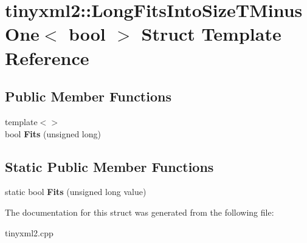 \hypertarget{structtinyxml2_1_1_long_fits_into_size_t_minus_one}{}\section{tinyxml2\+:\+:Long\+Fits\+Into\+Size\+T\+Minus\+One$<$ bool $>$ Struct Template Reference}
\label{structtinyxml2_1_1_long_fits_into_size_t_minus_one}
\subsection*{Public Member Functions}
\begin{DoxyCompactItemize}
\item 
{\footnotesize template$<$$>$ }\\bool {\bfseries Fits} (unsigned long)\hypertarget{structtinyxml2_1_1_long_fits_into_size_t_minus_one_a85fb9734fefa25d130ea831f683fc444}{}\label{structtinyxml2_1_1_long_fits_into_size_t_minus_one_a85fb9734fefa25d130ea831f683fc444}

\end{DoxyCompactItemize}
\subsection*{Static Public Member Functions}
\begin{DoxyCompactItemize}
\item 
static bool {\bfseries Fits} (unsigned long value)\hypertarget{structtinyxml2_1_1_long_fits_into_size_t_minus_one_a3057710104ab733963eb32fda0bc374c}{}\label{structtinyxml2_1_1_long_fits_into_size_t_minus_one_a3057710104ab733963eb32fda0bc374c}

\end{DoxyCompactItemize}


The documentation for this struct was generated from the following file\+:\begin{DoxyCompactItemize}
\item 
tinyxml2.\+cpp\end{DoxyCompactItemize}
